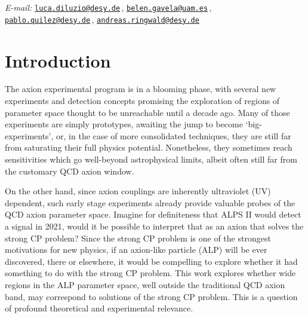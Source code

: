 \documentclass[a4paper,12pt]{article}
\numberwithin{equation}{section}
\renewcommand{\[}{\left[}
\renewcommand{\]}{\right]}
\renewcommand{\(}{\left(}
\renewcommand{\)}{\right)}
\newcommand{\email}[1]{\href{mailto:#1}{\tt #1}}
\begin{document}
\begin{center}
\begin{abstract}
\end{abstract}


\begin{minipage}[l]{.9\textwidth}
{\footnotesize \vspace{1cm}
\begin{center}
\textit{E-mail:} 
\email{luca.diluzio@desy.de}\,,
\email{belen.gavela@uam.es}\,, \\
\email{pablo.quilez@desy.de}\,,
\email{andreas.ringwald@desy.de}
\end{center}}
\end{minipage} 
\thispagestyle{empty}
\bigskip

\end{center}

\setcounter{footnote}{0}

\newpage
\tableofcontents


\newpage


\section{Introduction}
\label{sec:intro}

The axion experimental program is 
in a blooming phase, 
with several new experiments and detection concepts promising the exploration 
of regions of parameter space  thought to be 
unreachable until a decade ago. 
Many of those experiments are 
simply prototypes,
awaiting the jump to become `big-experiments', 
or, in the case of more consolidated techniques, 
they are still far from saturating their full physics potential.  
Nonetheless, they sometimes reach sensitivities 
which go well-beyond astrophysical limits, 
albeit often still far from the customary  QCD axion window. 

On the other hand, since axion couplings are inherently ultraviolet (UV) dependent, 
such early stage experiments already provide valuable probes of the 
QCD axion parameter space.  
 Imagine for definiteness that ALPS II 
would detect a signal in 2021, 
would it be possible to interpret that
 as an axion that solves  the strong CP problem?
 Since the strong CP problem is 
one of the strongest 
motivations 
for 
new physics, if an axion-like particle (ALP)  will be 
ever discovered, there or elsewhere, it would be 
 compelling to explore whether it had something
to do with the strong CP problem. 
This work explores whether 
 wide regions in the ALP parameter space, well outside the traditional QCD axion band, may correspond to solutions of the strong CP problem. This is a question of profound theoretical and experimental relevance.
\end{document}
